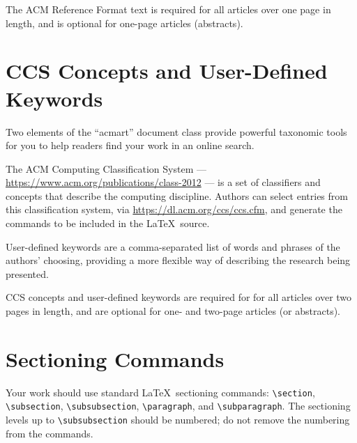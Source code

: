 \documentclass[sigconf]{acmart}
\begin{document}
The ACM Reference Format text is required for all articles over one
page in length, and is optional for one-page articles (abstracts).

\section{CCS Concepts and User-Defined Keywords}

Two elements of the ``acmart'' document class provide powerful
taxonomic tools for you to help readers find your work in an online
search.

The ACM Computing Classification System ---
\url{https://www.acm.org/publications/class-2012} --- is a set of
classifiers and concepts that describe the computing
discipline. Authors can select entries from this classification
system, via \url{https://dl.acm.org/ccs/ccs.cfm}, and generate the
commands to be included in the \LaTeX\ source.

User-defined keywords are a comma-separated list of words and phrases
of the authors' choosing, providing a more flexible way of describing
the research being presented.

CCS concepts and user-defined keywords are required for for all
articles over two pages in length, and are optional for one- and
two-page articles (or abstracts).

\section{Sectioning Commands}

Your work should use standard \LaTeX\ sectioning commands:
\verb|\section|, \verb|\subsection|, \verb|\subsubsection|,
\verb|\paragraph|, and \verb|\subparagraph|. The sectioning levels up to
\verb|\subsubsection| should be numbered; do not remove the numbering
from the commands.
\end{document}
